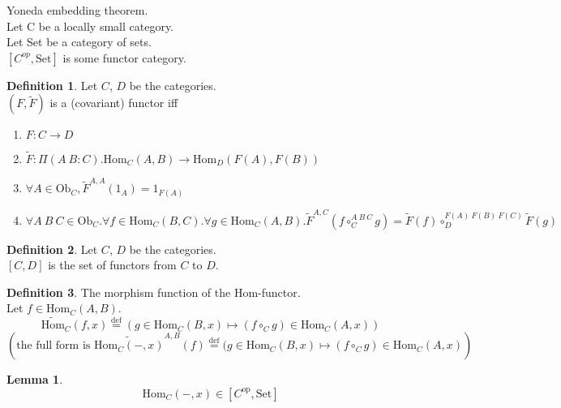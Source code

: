 \documentclass[10pt,a4paper]{article}
\theoremstyle{definition}
\newtheorem{definition}{Definition}[section]
\newtheorem{lemma}{Lemma}[section]
\newcommand{\Ob}{{\mbox{Ob}}}
\newcommand{\Hom}{{\mbox{Hom}}}
\newcommand{\op}{{\mbox{op}}}
\newcommand{\defi}{{\mbox{def}}}
\newcommand{\eqdef}{{\stackrel{\defi}{=}}}
\newcommand{\Set}{{\mbox{Set}}}
\newcommand{\ra}{{\rightarrow}}
\begin{document}
Yoneda embedding theorem.\\
Let C be a locally small category.\\
Let Set be a category of sets.\\
$[C^{op},\mbox{Set}]$ is some functor category.\\

\begin{definition}
Let $C$, $D$ be the categories.\\
 $(F, \widetilde{F})$ is a (covariant) functor iff\\
\begin{enumerate}
\item $F:C \ra D$
\item $\widetilde{F}:\Pi(A\ B:C).\Hom_C(A,B) \ra \Hom_D(F(A), F(B))$
\item $\forall A\in \Ob_C, \widetilde{F}^{A,A}(1_A)=1_{F(A)}$
\item $\forall A\ B\ C \in \Ob_C.\forall f\in\Hom_C(B,C).\forall g\in\Hom_C(A,B). \widetilde{F}^{A,C}(f\circ_C^{A\ B\ C} g)=\widetilde{F}(f)\circ_D^{F(A)\ F(B)\ F(C)} \widetilde{F}(g)$
\end{enumerate}

\end{definition}

\begin{definition}
Let $C$, $D$ be the categories.\\
$[C,D]$ is the set of functors from $C$ to $D$.\\
\end{definition}

\begin{definition} The morphism function of the Hom-functor.\\
Let $f\in\Hom_{C}(A,B)$.
$$\widetilde{\Hom}_C(f,x) \eqdef (g \in\Hom_C(B,x) \mapsto (f \circ_C g) \in\Hom_C(A,x))$$
$$\left(\mbox{the full form is }\widetilde{\Hom_C(-,x)}^{A,B}(f) \eqdef (g \in\Hom_C(B,x) \mapsto (f \circ_C g) \in\Hom_C(A,x)\right)$$
\end{definition}

\begin{lemma}
$$\Hom_C(-, x) \in [C^\op,\Set]$$
\end{lemma}
\end{document}
